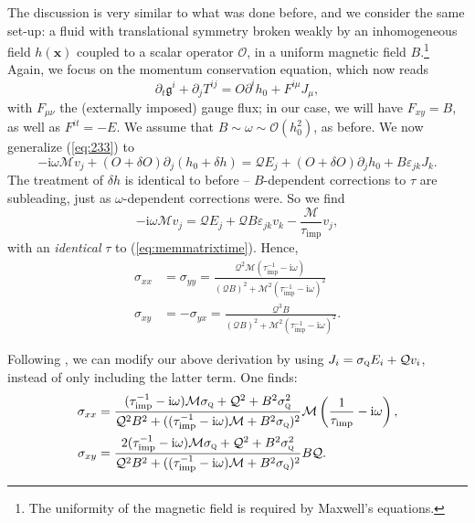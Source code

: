 \documentclass[10pt, oneside]{book}
\begin{document}
\begin{doublespace}
The discussion is very similar to what was done before, and we consider the same set-up:  a fluid with translational symmetry broken weakly by an inhomogeneous field $h(\mathbf{x})$ coupled to a scalar operator $\mathcal{O}$, in a uniform magnetic field $B$.\footnote{The uniformity of the magnetic field is required by Maxwell's equations.}   Again, we focus on the momentum conservation equation, which now reads \begin{equation}
\partial_t  \mathfrak{g}^i + \partial_j T^{ij} = O \partial^i h_0 + F^{i\mu}J_\mu,
\end{equation}
with $F_{\mu\nu}$ the (externally imposed) gauge flux;  in our case, we will have $F_{xy}=B$, as well as $F^{it} = -E$.   We assume that $B\sim \omega \sim \mathcal{O}(h_0^2)$, as before.    We now generalize (\ref{eq:233}) to \begin{equation}
-\mathrm{i}\omega \mathcal{M} v_j + (O+\delta O) \partial_j (h_0 + \delta h) = \mathcal{Q}E_j + (O+\delta O) \partial_j h_0 + B \varepsilon_{jk} J_k.
\end{equation} 
The treatment of $\delta h$ is identical to before -- $B$-dependent corrections to $\tau$ are subleading, just as $\omega$-dependent corrections were.   So we find
\begin{equation} \label{eq:HKMSB0}
-\mathrm{i}\omega \mathcal{M} v_j = \mathcal{Q}E_j + \mathcal{Q}B\varepsilon_{jk}v_k - \frac{\mathcal{M}}{\tau_{\mathrm{imp}}}v_j,
\end{equation} 
with an \emph{identical} $\tau$ to (\ref{eq:memmatrixtime}).  Hence, \begin{subequations}\label{eq:HKMSB1}\begin{align}
\sigma_{xx} &= \sigma_{yy} = \frac{\mathcal{Q}^2\mathcal{M}(\tau_{\mathrm{imp}}^{-1}-\mathrm{i}\omega)}{(\mathcal{Q}B)^2 + \mathcal{M}^2(\tau_{\mathrm{imp}}^{-1}-\mathrm{i}\omega)^2} \\
\sigma_{xy} &=  -\sigma_{yx}  = \frac{\mathcal{Q}^3B}{(\mathcal{Q}B)^2 + \mathcal{M}^2(\tau_{\mathrm{imp}}^{-1}-\mathrm{i}\omega)^2}.
\end{align}\end{subequations}

Following \cite{hkms}, we can modify our above derivation by using $J_i = \sigma_{\textsc{q}} E_i + \mathcal{Q}v_i$, instead of only including the latter term.   One finds: \begin{subequations}\label{eq:HKMSB}\begin{align}
\sigma_{xx} &= \frac{(\tau_{\mathrm{imp}}^{-1}-\mathrm{i}\omega)\mathcal{M}\sigma_{\textsc{q}} + \mathcal{Q}^2 + B^2\sigma_{\textsc{q}}^2}{\mathcal{Q}^2B^2 + ((\tau_{\mathrm{imp}}^{-1}-\mathrm{i}\omega)\mathcal{M}+B^2\sigma_{\textsc{q}})^2} \mathcal{M}\left(\frac{1}{\tau_{\mathrm{imp}}}-\mathrm{i}\omega\right), \\
\sigma_{xy} &=  \frac{2(\tau_{\mathrm{imp}}^{-1}-\mathrm{i}\omega)\mathcal{M}\sigma_{\textsc{q}} + \mathcal{Q}^2 + B^2\sigma_{\textsc{q}}^2}{\mathcal{Q}^2B^2 + ((\tau_{\mathrm{imp}}^{-1}-\mathrm{i}\omega)\mathcal{M}+B^2\sigma_{\textsc{q}})^2} B\mathcal{Q}.
\end{align}\end{subequations}



\end{doublespace}
\end{document}
